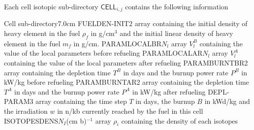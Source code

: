 Each cell isotopic sub-directory $\mathsf{CELL}_{i,j}$ contains the following information

\begin{DescriptionEnregistrement}{Cell sub-directory}{7.0cm}
\RealEnr
  {FUELDEN-INIT}{$2$}{}
  {array containing the initial density of heavy element in the fuel $\rho_{f}$  in g/cm$^{3}$ and the initial linear
density of heavy element in the fuel $m_{f}$ in g/cm.}
\RealEnr
  {PARAMLOCALBR}{$N_{l}$}{}
  {array $V^{B}_{l}$ containing the value of the local parameters before refueling}
\RealEnr
  {PARAMLOCALAR}{$N_{l}$}{}
 {array $V^{A}_{l}$ containing the value of the local parameters after refueling}
\RealEnr
  {PARAMBURNTBR}{2}{}
  {array containing the depletion time $T^{B}$ in days and the burnup power rate $P^{B}$ in kW/kg before refueling}
\RealEnr
  {PARAMBURNTAR}{2}{}
  {array containing the depletion time $T^{A}$ in days and the burnup power rate $P^{A}$ in kW/kg after refueling}
\RealEnr
  {DEPL-PARAM}{3}{}
  {array containing the time step $T$ in days, the burnup $B$ in kWd/kg and the irradiation $w$ in n/kb currently
reached by the fuel in this cell}
\RealEnr
  {ISOTOPESDENS}{$N_{I}$}{(cm b)$^{-1}$}
  {array $\rho_{i}$ containing the density of each isotopes}
\end{DescriptionEnregistrement}
\clearpage
